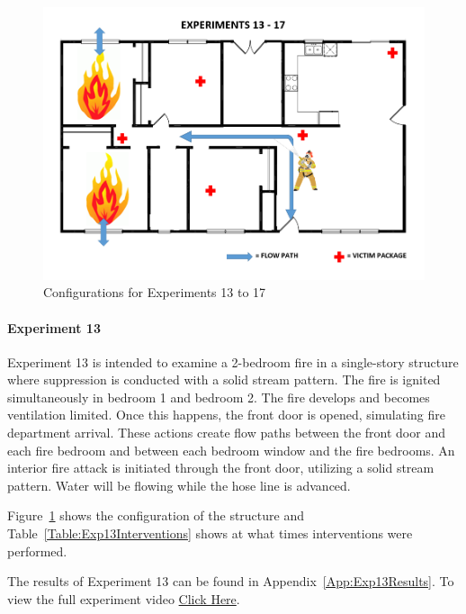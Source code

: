 \documentclass[12pt,oneside]{book}
\begin{document}
\begin{figure}[H]
	\centering
	\includegraphics[width=5in]{Figures/General/Exps13through17.png}
	\caption{Configurations for Experiments 13 to 17}
	\label{fig:ExpConfig13to17}
\end{figure}

\clearpage

\paragraph{Experiment 13} \mbox{}

Experiment 13 is intended to examine a 2-bedroom fire in a single-story structure where suppression is conducted with a solid stream pattern. The fire is ignited simultaneously in bedroom 1 and bedroom 2. The fire develops and becomes ventilation limited. Once this happens, the front door is opened, simulating fire department arrival. These actions create flow paths between the front door and each fire bedroom and between each bedroom window and the fire bedrooms. An interior fire attack is initiated through the front door, utilizing a solid stream pattern. Water will be flowing while the hose line is advanced.  

Figure~\ref{fig:ExpConfig13to17} shows the configuration of the structure and Table~\ref{Table:Exp13Interventions} shows at what times interventions were performed. 

The results of Experiment 13 can be found in Appendix~\ref{App:Exp13Results}. To view the full experiment video \href{https://youtu.be/gl8rc1Nsl1k}{Click Here}.
\end{document}
